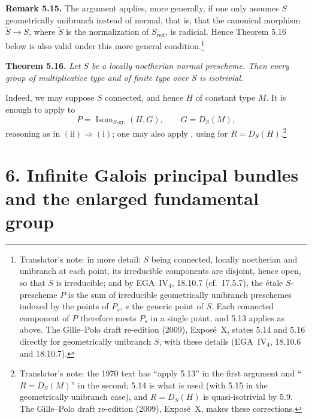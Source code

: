 \par\medskip\noindent
\textbf{Remark 5.15.}\enspace
The argument applies, more generally, if one only assumes \(S\)
geometrically unibranch instead of normal, that is, that the canonical
morphism \(\widetilde S\to S\), where \(\widetilde S\) is the normalization
of \(S_{\mathrm{red}}\), is radicial. Hence Theorem 5.16 below is also valid
under this more general condition.\footnote{Translator's note: in more
detail: \(S\) being connected, locally noetherian and unibranch at each
point, its irreducible components are disjoint, hence open, so that \(S\) is
irreducible; and by EGA~IV\(_4\), 18.10.7 (cf.\ 17.5.7), the étale
\(S\)-prescheme \(P\) is the sum of irreducible geometrically unibranch
preschemes indexed by the points of \(P_s\), \(s\) the generic point of
\(S\). Each connected component of \(P\) therefore meets \(P_s\) in a single
point, and 5.13 applies as above. The Gille--Polo draft re-edition (2009),
Expos\'e~X, states 5.14 and 5.16 directly for geometrically unibranch \(S\),
with these details (EGA~IV\(_4\), 18.10.6 and 18.10.7).}

\par\medskip\noindent
\textbf{Theorem 5.16.}\enspace
\emph{Let \(S\) be a locally noetherian normal prescheme. Then every group
of multiplicative type and of finite type over \(S\) is isotrivial.}

Indeed, we may suppose \(S\) connected, and hence \(H\) of constant type
\(M\). It is enough to apply  to
\[
  P=\operatorname{Isom}_{S\text{-gr.}}(H,G),
  \qquad G=D_S(M),
\]
reasoning as in  \(\mathrm{(ii)}\Rightarrow\mathrm{(i)}\); one may also apply
, using  for \(R=D_S(H)\).\footnote{Translator's note:
the 1970 text has ``apply 5.13'' in the first argument and ``\(R=D_S(M)\)'' in
the second; 5.14 is what is used (with 5.15 in the geometrically unibranch
case), and \(R=D_S(H)\) is quasi-isotrivial by 5.9. The Gille--Polo draft
re-edition (2009), Expos\'e~X, makes these corrections.}

\section*{6. Infinite Galois principal bundles and the enlarged fundamental group}
{}

